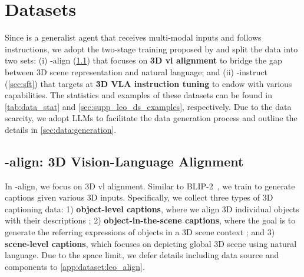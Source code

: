 \documentclass{article}
\begin{document}
\section{Datasets}\label{sec:data}

Since \agent is a generalist agent that receives multi-modal inputs and follows instructions, we adopt the two-stage training proposed by \citet{liu2023visual} and split the data into two sets: (i) \agent-align (\cref{sec:data:align}) that focuses on \textbf{3D \ac{vl} alignment} to bridge the gap between 3D scene representation and natural language; and (ii) \agent-instruct (\cref{sec:sft}) that targets at \textbf{3D VLA instruction tuning} to endow \agent with various capabilities. The statistics and examples of these datasets can be found in \cref{tab:data_stat} and \cref{sec:supp_leo_ds_examples}, respectively. Due to the data scarcity, we adopt LLMs to facilitate the data generation process and outline the details in \cref{sec:data:generation}.

\subsection{\agent-align: 3D Vision-Language Alignment}\label{sec:data:align}
In \agent-align, we focus on 3D \ac{vl} alignment. Similar to BLIP-2~\citep{li2023blip}, we train \agent to generate captions given various 3D inputs. Specifically, we collect three types of 3D captioning data: 1) \textbf{object-level captions}, where we align 3D individual objects with their descriptions \citep{luo2023scalable}; 2) \textbf{object-in-the-scene captions}, where the goal is to generate the referring expressions of objects in a 3D scene context \citep{achlioptas2020referit3d,zhu20233d}; and 3) \textbf{scene-level captions}, which focuses on depicting global 3D scene using natural language. Due to the space limit, we defer details including data source and components to \cref{app:dataset:leo_align}.
\end{document}

